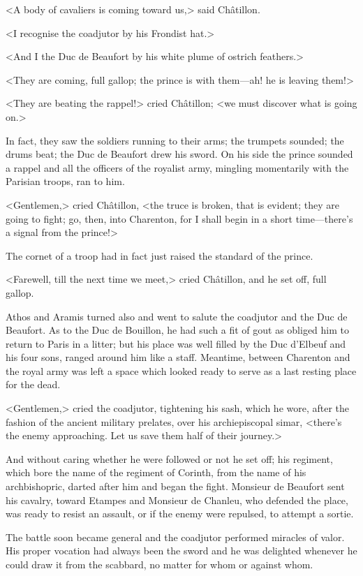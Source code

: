 <A body of cavaliers is coming toward us,> said Châtillon.

<I recognise the coadjutor by his Frondist hat.>

<And I the Duc de Beaufort by his white plume of ostrich feathers.>

<They are coming, full gallop; the prince is with them—ah! he is leaving them!>

<They are beating the rappel!> cried Châtillon; <we must discover what is going on.>

In fact, they saw the soldiers running to their arms; the trumpets sounded; the drums beat; the Duc de Beaufort drew his sword. On his side the prince sounded a rappel and all the officers of the royalist army, mingling momentarily with the Parisian troops, ran to him.

<Gentlemen,> cried Châtillon, <the truce is broken, that is evident; they are going to fight; go, then, into Charenton, for I shall begin in a short time—there's a signal from the prince!>

The cornet of a troop had in fact just raised the standard of the prince.

<Farewell, till the next time we meet,> cried Châtillon, and he set off, full gallop.

Athos and Aramis turned also and went to salute the coadjutor and the Duc de Beaufort. As to the Duc de Bouillon, he had such a fit of gout as obliged him to return to Paris in a litter; but his place was well filled by the Duc d'Elbeuf and his four sons, ranged around him like a staff. Meantime, between Charenton and the royal army was left a space which looked ready to serve as a last resting place for the dead.

<Gentlemen,> cried the coadjutor, tightening his sash, which he wore, after the fashion of the ancient military prelates, over his archiepiscopal simar, <there's the enemy approaching. Let us save them half of their journey.>

And without caring whether he were followed or not he set off; his regiment, which bore the name of the regiment of Corinth, from the name of his archbishopric, darted after him and began the fight. Monsieur de Beaufort sent his cavalry, toward Etampes and Monsieur de Chanleu, who defended the place, was ready to resist an assault, or if the enemy were repulsed, to attempt a sortie.

The battle soon became general and the coadjutor performed miracles of valor. His proper vocation had always been the sword and he was delighted whenever he could draw it from the scabbard, no matter for whom or against whom.

